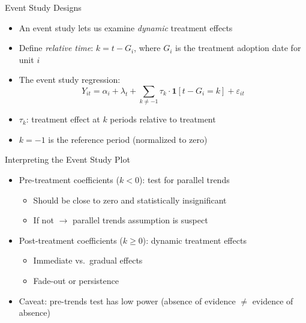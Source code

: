 \documentclass[10pt, handout]{beamer}
\begin{document}
\begin{frame}{Event Study Designs}
  \begin{itemize}
    \item An event study lets us examine \textit{dynamic} treatment effects
    \item Define \textit{relative time}: $k = t - G_i$, where $G_i$ is the treatment adoption date for unit $i$
    \item The event study regression:
      $$
        Y_{it} = \alpha_i + \lambda_t + \sum_{k \neq -1} \tau_k \cdot \mathbf{1}[t - G_i = k] + \varepsilon_{it}
      $$
    \item $\tau_k$: treatment effect at $k$ periods relative to treatment
    \item $k = -1$ is the reference period (normalized to zero)
  \end{itemize}
\end{frame}

\begin{frame}{Interpreting the Event Study Plot}
  \begin{itemize}
    \item Pre-treatment coefficients ($k < 0$): test for parallel trends
      \begin{itemize}
        \item Should be close to zero and statistically insignificant
        \item If not $\to$ parallel trends assumption is suspect
      \end{itemize}
    \item Post-treatment coefficients ($k \geq 0$): dynamic treatment effects
      \begin{itemize}
        \item Immediate vs.\ gradual effects
        \item Fade-out or persistence
      \end{itemize}
    \item Caveat: pre-trends test has low power (absence of evidence $\neq$ evidence of absence)
  \end{itemize}
\end{frame}
\end{document}

